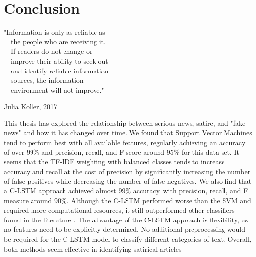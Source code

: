 \documentclass [12 pt] {report}
\begin{document}
\chapter{Conclusion}
\singlespacing
\epigraph{"Information is only as reliable as\\~~the people who are receiving it.\\~~If readers do not change or\\~~improve their ability to seek out \\~~and identify reliable information\\~~sources, the information\\~~environment will not improve."}{Julia Koller, 2017}
\onehalfspacing
This thesis has explored the relationship between serious news, satire, and "fake news" and how it has changed over time. We found that Support Vector Machines tend to perform best with all available features, regularly achieving an accuracy of over 99\% and precision, recall, and F score around 95\% for this data set. It seems that the TF-IDF weighting with balanced classes tends to increase accuracy and recall at the cost of precision by significantly increasing the number of false positives while decreasing the number of false negatives. We also find that a C-LSTM approach achieved almost 99\% accuracy, with precision, recall, and F measure around 90\%. Although the C-LSTM performed worse than the SVM and required more computational resources, it still outperformed other classifiers found in the literature \cite{Burfoot} \cite{Yang}. The advantage of the C-LSTM approach is flexibility, as no features need to be explicitly determined. No additional preprocessing would be required for the C-LSTM model to classify different categories of text. Overall, both methods seem effective in identifying satirical articles
\end{document}
